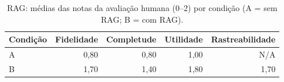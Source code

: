 \begin{table}[t]
\centering
\caption{RAG: médias das notas da avaliação humana (0--2) por condição (A = sem RAG; B = com RAG).}
\label{tab:rag_grades}
\small
\begin{tabular}{lrrrr}
\toprule
Condição & Fidelidade & Completude & Utilidade & Rastreabilidade \\
\midrule
A & 0,80 & 0,80 & 1,00 & N/A \\
B & 1,70 & 1,40 & 1,80 & 1,70 \\
\bottomrule
\end{tabular}
\end{table}
